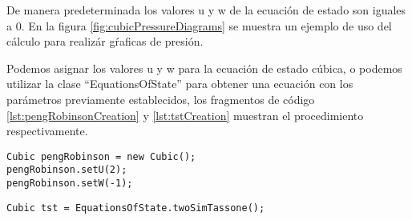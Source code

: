 De manera predeterminada los valores u y w de la ecuación de estado son iguales a 0. En la figura \ref{fig:cubicPressureDiagrams} se muestra un ejemplo de uso del cálculo para realizár gŕaficas de presión.

Podemos asignar los valores u y w para la ecuación de estado cúbica, o podemos utilizar la clase ``EquationsOfState'' para obtener una ecuación con los parámetros previamente establecidos, los fragmentos de código \ref{lst:pengRobinsonCreation} y \ref{lst:tstCreation} muestran el procedimiento respectivamente.

\begin{lstlisting}[label=lst:pengRobinsonCreation,caption=Creación de la ecuación de estado de Peng Robinson usando los metodos `Set' de los parametros u y w]
Cubic pengRobinson = new Cubic();
pengRobinson.setU(2);
pengRobinson.setW(-1);
\end{lstlisting}

\begin{lstlisting}[label=lst:tstCreation,caption=Creación de la ecuación de estado de TST usando la clase EquationsOfState]
Cubic tst = EquationsOfState.twoSimTassone();
\end{lstlisting}












